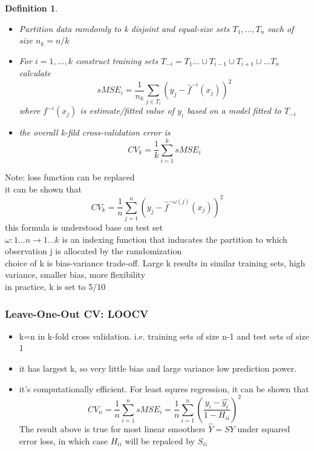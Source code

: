 \documentclass[10pt]{article}
\theoremstyle{break}
\newtheorem{defn}{Definition}[subsection]
\begin{document}
            \begin{defn}
                \begin{itemize}
                    \item Partition data ramdomly to k disjoint and equal-size sets $T_1, ..., T_n$ each of size $n_k=n/k$
                    \item For $ i=1,...,k$ construct training sets $T_{-i}=T_1 ... \cup T_{i-1} \cup T_{i+1} \cup ... T_n$
                    \\ calculate $$sMSE_i = \frac{1}{n_k}\sum_{j\in T_i}\left(y_j-\hat{f}^{-i}(x_j)\right)^2$$
                    where $f^{-i}(x_j)$ is estimate/fitted value of $y_i$ based on a model fitted to $T_{-i}$
                    \item the overall k-fild cross-validation error is 
                    $$CV_k = \frac{1}{k}\sum^k_{i=1}sMSE_i$$
                \end{itemize}
            \end{defn}
            Note: loss function can be replaced
            \\ it can be shown that 
            $$CV_k=\frac{1}{n}\sum_{j=1}^n\left(y_j-\hat{f}^{-\omega(j)}(x_j)\right)^2$$ this formula is understood base on test set\\
            $\omega:{1 ... n} \rightarrow {1 ... k}$ is an indexing function that inducates the partition to which observation j is allocated by the ramdomization 
            \\{\Large choice of k is bias-variance trade-off. Large k results in similar training sets, high variance, smaller bias, more flexibility} 
            \\in practice, k is set to 5/10
        \subsubsection{Leave-One-Out CV: LOOCV}
            \begin{itemize}
                \item k=n in k-fold cross validation. i.e. training sets of size n-1 and test sets of size 1
                \item it has largest k, so very little bias and large variance low prediction power.
                \item it's computationally efficient. For least squres regression, it can be shown that 
                $$CV_n=\frac{1}{n}\sum_{i=1}^nsMSE_i=\frac{1}{n}\sum_{i=1}^n\left(\frac{y_i-\hat{y_i}}{1-H_{ii}}\right)^2$$
                The result above is true for most linear smoothers $\hat{Y}=SY$ under squared error loss, in which case $H_{ii}$ will be repalced by $S_{ii}$
            \end{itemize}
\end{document}
